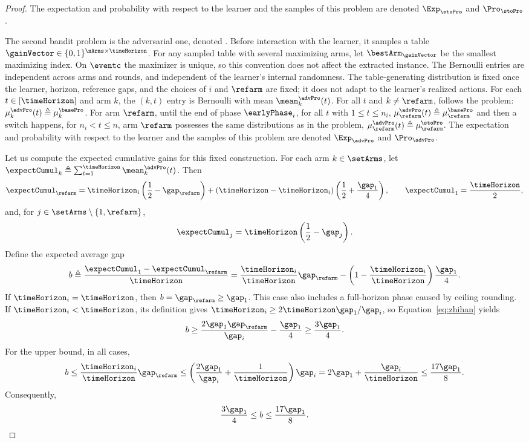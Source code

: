 \begin{proof}
	The expectation and probability with respect to the
	learner and the samples of this problem are denoted
	$\Exp_{\stoPro}$ and $\Pro_{\stoPro}$.
	

	
	The second bandit problem is the adversarial one, denoted \advPro{}.
Before interaction with the learner, it samples a table
$\gainVector\in\{0,1\}^{\nArms\times\timeHorizon}$.
For any sampled table with several maximizing arms, let
$\bestArm_{\gainVector}$ be the smallest maximizing index.
On $\eventc$ the maximizer is unique, so this convention does
not affect the extracted instance.
The Bernoulli entries are independent across arms and rounds,
and independent of the learner's internal randomness.
The table-generating distribution is fixed once the learner,
horizon, reference gaps, and the choices of $i$ and $\refarm$ are fixed;
it does not adapt to the learner's realized actions.
For each $t\in[\timeHorizon]$ and arm $k$, the $(k,t)$ entry is
Bernoulli with mean $\mean_k^{\advPro}(t)$.
	For all $t$ and $k\neq\refarm$, \advPro{} follows the \basePro{} 
	problem:  $\mu_{k}^{\advPro}(t)\triangleq\mu_{k}^{\basePro}$.
	For arm $\refarm$,
	until the end of phase $\earlyPhase_i$, for all $t$ with $1\leq 
	t\leq n_i$, $\mu^{\advPro}_{\refarm}(t)\triangleq\mu_{\refarm}^{\basePro}$ 
	and then a switch happens, for $n_i< t\leq n$, arm $\refarm$ 
	possesses  the same distributions as in the \stoPro{} problem,  
	$\mu^{\advPro}_{\refarm}(t)\triangleq \mu_{\refarm}^{\stoPro}$.
	The expectation and probability with respect to the
	learner and the samples of this problem are denoted
	$\Exp_{\advPro}$ and $\Pro_{\advPro}$.
	
	
Let us compute the expected cumulative gains for this fixed construction.
For each arm $k\in\setArms$, let
$\expectCumul_k\triangleq\sum_{t=1}^{\timeHorizon}\mean_k^{\advPro}(t)$.
Then
\[
\expectCumul_{\refarm}
=\timeHorizon_i\left(\frac12-\gap_{\refarm}\right)
+(\timeHorizon-\timeHorizon_i)\left(\frac12+\frac{\gap_1}{4}\right),
\qquad \expectCumul_1=\frac{\timeHorizon}{2},
\]
and, for $j\in\setArms\setminus\{1,\refarm\}$,
\[
\expectCumul_j=\timeHorizon\left(\frac12-\gap_j\right).
\]
Define the expected average gap
\[
b\triangleq\frac{\expectCumul_1-\expectCumul_{\refarm}}{\timeHorizon}
=\frac{\timeHorizon_i}{\timeHorizon}\gap_{\refarm}
-\left(1-\frac{\timeHorizon_i}{\timeHorizon}\right)\frac{\gap_1}{4}.
\]
If $\timeHorizon_i=\timeHorizon$, then $b=\gap_{\refarm}\geq\gap_1$.
This case also includes a full-horizon phase caused by ceiling rounding.
If $\timeHorizon_i<\timeHorizon$, its definition gives
$\timeHorizon_i\geq2\timeHorizon\gap_1/\gap_i$, so
Equation~\ref{eq:zhihan} yields
\[
b\geq\frac{2\gap_1\gap_{\refarm}}{\gap_i}-\frac{\gap_1}{4}
\geq\frac{3\gap_1}{4}.
\]
For the upper bound, in all cases,
\[
b\leq\frac{\timeHorizon_i}{\timeHorizon}\gap_{\refarm}
\leq\left(\frac{2\gap_1}{\gap_i}+\frac{1}{\timeHorizon}\right)\gap_i
=2\gap_1+\frac{\gap_i}{\timeHorizon}
\leq\frac{17\gap_1}{8}.
\]
Consequently,
\[
\frac{3\gap_1}{4}\leq b\leq\frac{17\gap_1}{8}.
\]


\end{proof}
